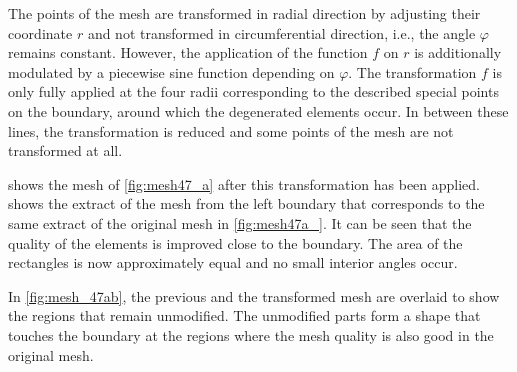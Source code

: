 The points of the mesh are transformed in radial direction by adjusting their coordinate $r$ and not transformed in circumferential direction, i.e., the angle $\varphi$ remains constant. However, the application of the function $f$ on $r$ is additionally modulated by a piecewise sine function depending on $\varphi$. The transformation $f$ is only fully applied at the four radii corresponding to the described special points on the boundary, around which the degenerated elements occur. In between these lines, the transformation is reduced and some points of the mesh are not transformed at all.

 shows the mesh of \cref{fig:mesh47_a} after this transformation has been applied.  shows the extract of the mesh from the left boundary that corresponds to the same extract of the original mesh in \cref{fig:mesh47a_}.
It can be seen that the quality of the elements is improved close to the boundary. The area of the rectangles is now approximately equal and no small interior angles occur.

In \cref{fig:mesh_47ab}, the previous and the transformed mesh are overlaid to show the regions that remain unmodified. The unmodified parts form a  shape that touches the boundary at the regions where the mesh quality is also good in the original mesh.


